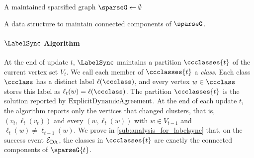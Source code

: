\begin{algorithm}[htbp]
    \KwIn{}
    \KwOut{}
        A maintained sparsified graph $ \sparseG \gets \emptyset $

        A data structure to maintain connected components of $ \sparseG $. 



         
        



        \KwRet{}
    \caption{$ \explicitDA $: Explicit Dynamic Agreement Algorithm for Insertion-Only Stream}
    \label{alg.explicit.dynamic.agreement}
\end{algorithm}

\paragraph{\texorpdfstring{$ \LabelSync $}{LabelSync} Algorithm}\label{par:_texorpdfstring_labelsync_labelsync_algorithm} %
At the end of update $ t $, $ \LabelSync $ maintains a partition $ \ccclasses{t} $ of the current vertex set $ V_t $.
We call each member of $ \ccclasses{t} $ a \emph{class}.
Each class $ \ccclass $ has a distinct label $ \ell(\ccclass) $, and every vertex $ w\in\ccclass $ stores this label as $ \ell_t(w)=\ell(\ccclass) $.
The partition $ \ccclasses{t} $ is the solution reported by $ \explicitDA $.
At the end of each update $ t $, the algorithm reports only the vertices that changed clusters, that is, $ (v_t,\ell_t(v_t)) $ and every $ (w,\ell_t(w)) $ with $ w\in V_{t-1} $ and $ \ell_t(w)\ne\ell_{t-1}(w) $.
We prove in \cref{sub:analysis_for_labelsync} that, on the success event $ \mathcal{E}_{\rm DA} $, the classes in $ \ccclasses{t} $ are exactly the connected components of $ \sparseG{t} $.

